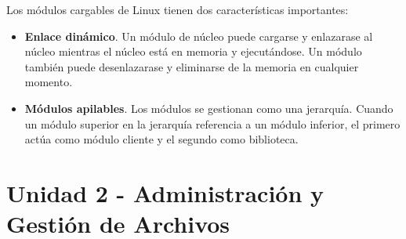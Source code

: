 \documentclass[12pt]{article}
\begin{document}
  Los módulos cargables de Linux tienen dos características importantes:
  \begin{itemize}
    \item \textbf{Enlace dinámico}. Un módulo de núcleo puede cargarse y enlazarase al núcleo mientras el núcleo está en memoria y ejecutándose. Un módulo también puede desenlazarase y eliminarse de la memoria en cualquier momento.

    \item \textbf{Módulos apilables}. Los módulos se gestionan como una jerarquía. Cuando un módulo superior en la jerarquía referencia a un módulo inferior, el primero actúa como módulo cliente y el segundo como biblioteca.
  \end{itemize}

  \section{Unidad 2 - Administración y Gestión de Archivos}
    

  


  


  

  \newpage
  \printbibliography
\end{document}
